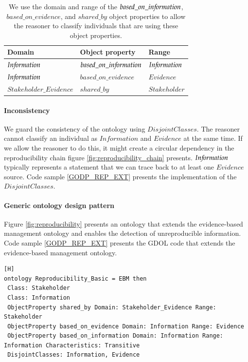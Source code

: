 \begin{table}[H]
\centering
\caption{We use the domain and range of the $based\_on\_in{\mkern-2mu f\mkern-3mu}ormation$, $based\_on\_evidence$, and $shared\_by$ object properties to allow the reasoner to classify individuals that are using these object properties.}
\begin{tabular}{| p{4cm} | p{6cm} |  p{4cm} |   }
\hline
\rowcolor{document}
\color{documentText}Domain & \color{documentText}Object property & \color{documentText}Range \\
\hline
$In{\mkern-2mu f\mkern-3mu}ormation$ & $based\_on\_in{\mkern-2mu f\mkern-3mu}ormation$ & $In{\mkern-2mu f\mkern-3mu}ormation$ \\
\hdashline
$In{\mkern-2mu f\mkern-3mu}ormation$ & $based\_on\_evidence$ & $Evidence$ \\
\hdashline
$Stakeholder\_Evidence$ & $shared\_by$ & $Stakeholder$ \\
\hline
\end{tabular}
\label{table:rep_inference}
\end{table}

\paragraph{Inconsistency} \label{rep_incons}
We guard the consistency of the ontology using $DisjointClasses$. The reasoner cannot classify an individual as $Information$ and $Evidence$ at the same time. If we allow the reasoner to do this, it might create a circular dependency in the reproducibility chain figure \ref{fig:reproducibility_chain} presents. $In{\mkern-2mu f\mkern-3mu}ormation$ typically represents a statement that we can trace back to at least one $Evidence$ source. Code sample \ref{GODP_REP_EXT} presents the implementation of the $DisjointClasses$.

\paragraph{Generic ontology design pattern}
Figure \ref{fig:reproducibility} presents an ontology that extends the evidence-based management ontology and enables the detection of unreproducible information. Code sample \ref{GODP_REP_EXT} presents the GDOL code that extends the evidence-based management ontology. 

\begin{lstlisting}[float,language=GDOL,caption={The GDOL code for relating information to evidence and stakeholder evidence to a stakeholder. We introduce two new classes ($Stakeholder$ and $Information$) and three new object properties ($shared\_by$, $based\_on\_evidence$, and $based\_on\_in{\f}ormation$. Additionally, we define that $Information$ and $Evidence$ are disjoint. Figure \ref{fig:reproducibility} visualises the result of executing the code.},label={GODP_REP_EXT}][H]
ontology Reproducibility_Basic = EBM then 
 Class: Stakeholder 
 Class: Information 
 ObjectProperty shared_by Domain: Stakeholder_Evidence Range: Stakeholder 
 ObjectProperty based_on_evidence Domain: Information Range: Evidence
 ObjectProperty based_on_information Domain: Information Range: Information Characteristics: Transitive
 DisjointClasses: Information, Evidence
\end{lstlisting}

